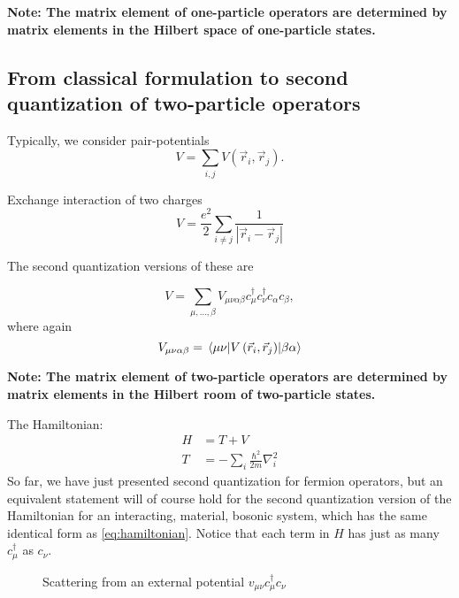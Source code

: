 \textbf{Note: The matrix element of one-particle operators are determined by matrix elements in the Hilbert space of one-particle states.}

\subsection{From classical formulation to second quantization of two-particle operators}

Typically, we consider pair-potentials 
\begin{equation}
V = \sum_{i, j} V\left(\vec{r}_i, \vec{r}_j\right).
\end{equation}

\begin{theorem}
Exchange interaction of two charges
\begin{equation}
V = \frac{e^2}{2}\sum_{i\ne j} \frac{1}{|\vec{r}_i - \vec{r}_j|}
\end{equation}
\end{theorem}

The second quantization versions of these are

\begin{equation}
V = \sum_{\mu, \dots, \beta} V_{\mu\nu\alpha\beta}c_{\mu}^\dagger c_{\nu}^\dagger c_{\alpha}c_{\beta},
\end{equation}
where again
\begin{equation}
V_{\mu\nu\alpha\beta} = \mel{\mu\nu}{V\left(\vec{r}_i, \vec{r}_j\right)}{\beta\alpha}
\end{equation}

\textbf{Note: The matrix element of two-particle operators are determined by matrix elements in the Hilbert room of two-particle states.}

The Hamiltonian:
\begin{align}
H &= T + V \label{eq:hamiltonian} \\
T &= -\sum_i \frac{\hbar^2}{2m}\nabla_i^2
\end{align}
So far, we have just presented second quantization for fermion operators, but an equivalent statement will of course hold for the second quantization version of the Hamiltonian for an interacting, material, bosonic system, which has the same identical form as \eqref{eq:hamiltonian}. Notice that each term in $H$ has just as many $c_\mu^\dagger$ as $c_{\nu}$.


\begin{figure}
\centering

\caption{Scattering from an external potential $v_{\mu\nu}c_{\mu}^\dagger c_{\nu}$}
\end{figure}


